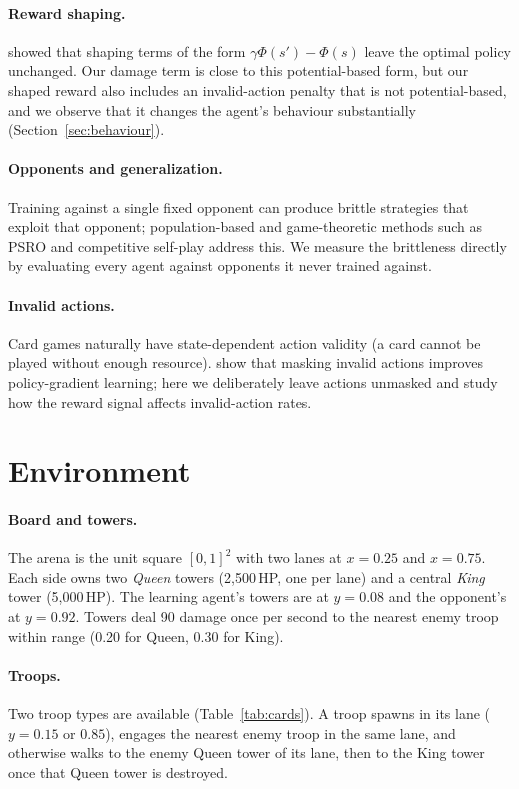 \documentclass[11pt]{article}
\begin{document}
\paragraph{Reward shaping.}
\citet{ng1999shaping} showed that shaping terms of the form
$\gamma\Phi(s') - \Phi(s)$ leave the optimal policy unchanged. Our damage term
is close to this potential-based form, but our shaped reward also includes an
invalid-action penalty that is not potential-based, and we observe that it
changes the agent's behaviour substantially (Section~\ref{sec:behaviour}).

\paragraph{Opponents and generalization.}
Training against a single fixed opponent can produce brittle strategies that
exploit that opponent; population-based and game-theoretic methods such as
PSRO \citep{lanctot2017psro} and competitive self-play
\citep{bansal2018emergent} address this. We measure the brittleness directly
by evaluating every agent against opponents it never trained against.

\paragraph{Invalid actions.}
Card games naturally have state-dependent action validity (a card cannot be
played without enough resource). \citet{huang2022masking} show that masking
invalid actions improves policy-gradient learning; here we deliberately leave
actions unmasked and study how the reward signal affects invalid-action rates.

\section{Environment}
\label{sec:env}

\paragraph{Board and towers.}
The arena is the unit square $[0,1]^2$ with two lanes at $x=0.25$ and
$x=0.75$. Each side owns two \emph{Queen} towers (2{,}500\,HP, one per lane)
and a central \emph{King} tower (5{,}000\,HP). The learning agent's towers
are at $y=0.08$ and the opponent's at $y=0.92$. Towers deal 90 damage once per
second to the nearest enemy troop within range (0.20 for Queen, 0.30 for King).

\paragraph{Troops.}
Two troop types are available (Table~\ref{tab:cards}). A troop spawns in its
lane ($y=0.15$ or $0.85$), engages the nearest enemy troop in the same lane,
and otherwise walks to the enemy Queen tower of its lane, then to the King
tower once that Queen tower is destroyed.
\end{document}

